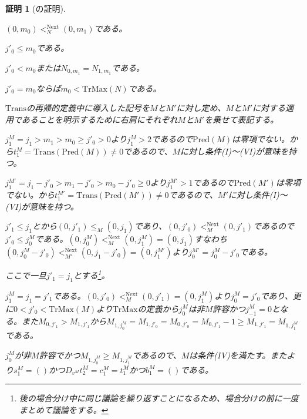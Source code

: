 \documentclass[dvipdfmx,uplatex]{jsarticle}
\theoremstyle{customnonumberbreakfortheorem}
\theoremstyle{customnonumberbreakforproof}
\newtheorem{hideableproof}{証明}
\begin{document}
\begin{hideableproof}[の証明]
\begin{indented}
		\begin{penumerate}
			\item \((0,m_0) <_N^{\textrm{Next}} (0,m_1)\)である。
			\item \(j'_0 \leq m_0\)である。
			\item \(j'_0 < m_0\)または\(N_{0,m_1} = N_{1,m_1}\)である。
			\item \(j'_0 = m_0\)ならば\(m_0 < \textrm{TrMax}(N)\)である。
		\end{penumerate}
		\item \(\textrm{Trans}\)の再帰的定義中に導入した記号を\(M\)と\(M'\)に対し定め、\(M\)と\(M'\)に対する適用であることを明示するために右肩にそれぞれ\(M\)と\(M'\)を乗せて表記する。
		\item \(j_1^M = j_1 > m_1 > m_0 \geq j'_0 > 0\)より\(j_1^M > 2\)であるので\(\textrm{Pred}(M)\)は零項でない。から\(t_1^M = \textrm{Trans}(\textrm{Pred}(M)) \neq 0\)であるので、\(M\)に対し条件(I)～(VI)が意味を持つ。
		\item \(j_1^{M'} = j_1-j'_0 > m_1-j'_0 > m_0-j'_0 \geq 0\)より\(j_1^{M'} > 1\)であるので\(\textrm{Pred}(M')\)は零項でない。から\(t_1^{M'} = \textrm{Trans}(\textrm{Pred}(M')) \neq 0\)であるので、\(M'\)に対し条件(I)～(VI)が意味を持つ。
		\item \(j'_1 \leq j_1\)とから\((0,j'_1) \leq_M (0,j_1)\)であり、\((0,j'_0) <_M^{\textrm{Next}} (0,j'_1)\)であるので\(j'_0 \leq j_0^M\)である。\((0,j_0^M) <_M^{\textrm{Next}} (0,j_1^M) = (0,j_1)\)すなわち\((0,j_0^M-j'_0) <_{M'}^{\textrm{Next}} (0,j_1-j'_0) = (0,j_1^{M'})\)より\(j_0^{M'} = j_0^M-j'_0\)である。
		\item
		\item ここで一旦\(j'_1 = j_1\)とする\footnote{後の場合分け中に同じ議論を繰り返すことになるため、場合分けの前に一度まとめて議論をする。}。
		\begin{indented}
			\item \(j_1^M = j_1 = j'_1\)である。\((0,j'_0) <_M^{\textrm{Next}} (0,j'_1) = (0,j_1^M)\)より\(j_0^M = j'_0\)であり、更に\(0 < j'_0 < \textrm{TrMax}(M)\)より\(\textrm{TrMax}\)の定義から\(j_0^M\)は非\(M\)許容かつ\(j_{-1}^M = 0\)となる。また\(M_{0,j'_1} > M_{1,j'_1}\)から\(M_{1,j_0^M} = M_{1,j'_0} = M_{0,j'_0} = M_{0,j'_1}-1 \geq M_{1,j'_1} = M_{1,j_1^M}\)である。
			\item \(j_0^M\)が非\(M\)許容でかつ\(M_{1,j_0^M} \geq M_{1,j_1^M}\)であるので、\(M\)は条件(IV)を満たす。またより\(s_1^M = ()\)かつ\(D_{v^M} t_2^M = c_1^M = t_1^M\)かつ\(b_1^M = ()\)である。

\end{indented}
\end{indented}
\end{hideableproof}
\end{document}
